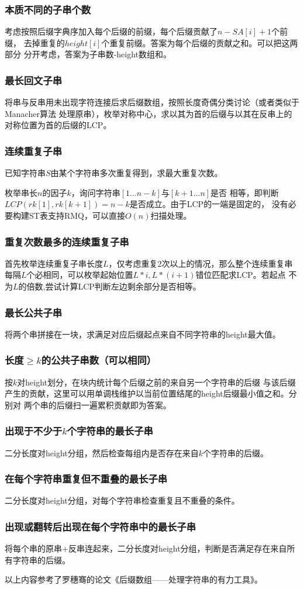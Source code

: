 \subsubsection{本质不同的子串个数}
考虑按照后缀字典序加入每个后缀的前缀，每个后缀贡献了$n-SA[i]+1$个前缀，
去掉重复的$height[i]$个重复前缀。答案为每个后缀的贡献之和。可以把这两部分
分开考虑，答案为子串数-height数组和。
\subsubsection{最长回文子串}
将串与反串用未出现字符连接后求后缀数组，按照长度奇偶分类讨论（或者类似于Manacher算法
处理原串），枚举对称中心，求以其为首的后缀与以其在反串上的对称位置为首的后缀的LCP。
\subsubsection{连续重复子串}
已知字符串$S$由某个字符串多次重复得到，求最大重复次数。

枚举串长$n$的因子$k$，询问字符串$[1\ldots n-k]$与$[k+1\ldots n]$是否
相等，即判断$LCP(rk[1],rk[k+1])=n-k$是否成立。由于LCP的一端是固定的，
没有必要构建ST表支持RMQ，可以直接$O(n)$扫描处理。
\subsubsection{重复次数最多的连续重复子串}
首先枚举连续重复子串长度$L$，仅考虑重复2次以上的情况，那么整个连续重复串
每隔$L$个必相同，可以枚举起始位置$L*i,L*(i+1)$错位匹配求LCP。若起点
不为$L$的倍数,尝试计算LCP判断左边剩余部分是否相等。
\subsubsection{最长公共子串}
将两个串拼接在一块，求满足对应后缀起点来自不同字符串的height最大值。
\subsubsection{长度$\geq k$的公共子串数（可以相同）}
按$k$对height划分，在块内统计每个后缀之前的来自另一个字符串的后缀
与该后缀产生的贡献，这里可以用单调栈维护以当前位置结尾的height后缀最小值之和。分别对
两个串的后缀扫一遍累积贡献即为答案。
\subsubsection{出现于不少于$k$个字符串的最长子串}
二分长度对height分组，然后检查每组内是否存在来自$k$个字符串的后缀。
\subsubsection{在每个字符串重复但不重叠的最长子串}
二分长度对height分组，对每个字符串检查重复且不重叠的条件。
\subsubsection{出现或翻转后出现在每个字符串中的最长子串}
将每个串的原串+反串连起来，二分长度对height分组，判断是否满足存在来自所有字符串的后缀。

以上内容参考了罗穗骞的论文《后缀数组——处理字符串的有力工具》。
